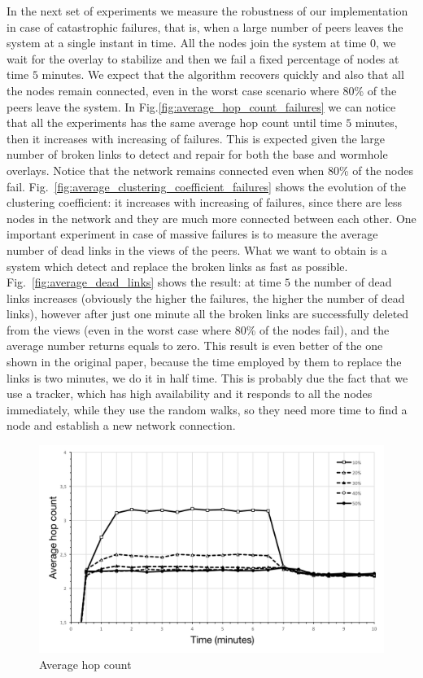 In the next set of experiments we measure the robustness of our implementation in case of catastrophic failures, that is, when a large number of peers leaves the system at a single instant in time. All the nodes join the system at time $0$, we wait for the overlay to stabilize and then we fail a fixed percentage of nodes at time $5$ minutes. We expect that the algorithm recovers quickly and also that all the nodes remain connected, even in the worst case scenario where 80\% of the peers leave the system. In Fig.\ref{fig:average_hop_count_failures} we can notice that all the experiments has the same average hop count until time $5$ minutes, then it increases with increasing of failures. This is expected given the large number of broken links to detect and repair for both the base and wormhole overlays. Notice that the network remains connected even when 80\% of the nodes fail. Fig.~\ref{fig:average_clustering_coefficient_failures} shows the evolution of the clustering coefficient: it increases with increasing of failures, since there are less nodes in the network and they are much more connected between each other. One important experiment in case of massive failures is to measure the average number of dead links in the views of the peers. What we want to obtain is a system which detect and replace the broken links as fast as possible. Fig.~\ref{fig:average_dead_links} shows the result: at time $5$ the number of dead links increases (obviously the higher the failures, the higher the number of dead links), however after just one minute all the broken links are successfully deleted from the views (even in the worst case where 80\% of the nodes fail), and the average number returns equals to zero. This result is even better of the one shown in the original paper, because the time employed by them to replace the links is two minutes, we do it in half time. This is probably due the fact that we use a tracker, which has high availability and it responds to all the nodes immediately, while they use the random walks, so they need more time to find a node and establish a new network connection.

\begin{figure}[ht]
  \centering
  \includegraphics[keepaspectratio=true, width=\textwidth]{images/average_hop_count_flash_crowd}\caption{Average hop count}
  \label{fig:average_hop_count_flash_crowd}
\end{figure}

